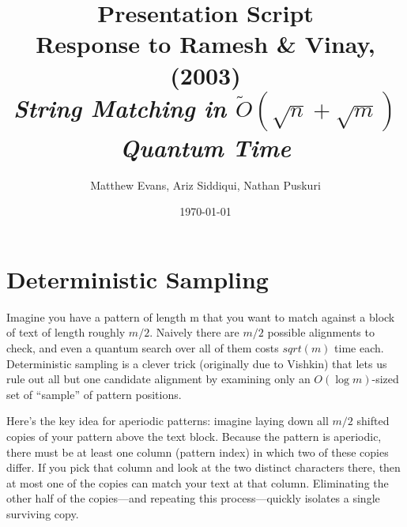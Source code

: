 \documentclass[11pt]{article}
\title{Presentation Script \\ 
\Large{Response to Ramesh \& Vinay, (2003)\\ 
\small{\textit{String Matching in \(\tilde{O}(\sqrt{n} + \sqrt{m})\) Quantum Time}} }}
\author{%
\normalsize{Matthew Evans, Ariz Siddiqui, Nathan Puskuri}
}
\date{\today}
\begin{document}
\maketitle

\section*{Deterministic Sampling}
Imagine you have a pattern of length m that you want to match against a block of text of length roughly \(m/2\). Naively there are \(m/2\) possible alignments to check, and even a quantum search over all of them costs \(sqrt(m)\) time each. Deterministic sampling is a clever trick (originally due to Vishkin) that lets us rule out all but one candidate alignment by examining only an \(O(\log m)\)-sized set of ``sample'' of pattern positions.

Here's the key idea for aperiodic patterns: imagine laying down all \(m/2\) shifted copies of your pattern above the text block. Because the pattern is aperiodic, there must be at least one column (pattern index) in which two of these copies differ. If you pick that column and look at the two distinct characters there, then at most one of the copies can match your text at that column. Eliminating the other half of the copies—and repeating this process—quickly isolates a single surviving copy.
\end{document}

